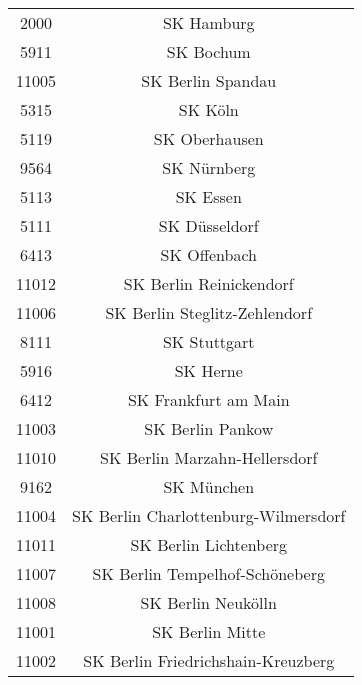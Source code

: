 \begin{tabular}{c c}
    2000&SK Hamburg\\ 
    5911&SK Bochum\\ 
    11005&SK Berlin Spandau\\ 
    5315&SK Köln\\ 
    5119&SK Oberhausen\\ 
    9564&SK Nürnberg\\ 
    5113&SK Essen\\ 
    5111&SK Düsseldorf\\ 
    6413&SK Offenbach\\ 
    11012&SK Berlin Reinickendorf\\ 
    11006&SK Berlin Steglitz-Zehlendorf\\ 
    8111&SK Stuttgart\\ 
    5916&SK Herne\\ 
    6412&SK Frankfurt am Main\\ 
    11003&SK Berlin Pankow\\ 
    11010&SK Berlin Marzahn-Hellersdorf\\ 
    9162&SK München\\ 
    11004&SK Berlin Charlottenburg-Wilmersdorf\\ 
    11011&SK Berlin Lichtenberg\\ 
    11007&SK Berlin Tempelhof-Schöneberg\\ 
    11008&SK Berlin Neukölln\\ 
    11001&SK Berlin Mitte\\ 
    11002&SK Berlin Friedrichshain-Kreuzberg\\ 

\end{tabular}